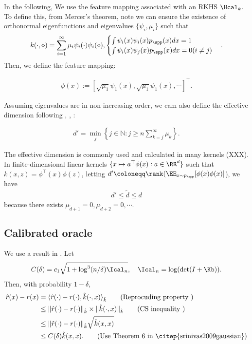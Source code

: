 In the following, We use the feature mapping associated with an RKHS $\Hcal_k$. To define this, from Mercer's theorem, note we can ensure the existence of orthonormal eigenfunctions and eigenvalues $\{\psi_i,\mu_i\}$ such that 
\begin{align*}
    k(\cdot,\diamond)=\sum_{i=1}^{\infty} \mu_i \psi_i(\cdot ) \psi_i(\diamond), \begin{cases} \int\psi_i(x)\psi_i(x)p_{\spp}(x)dx =1 \\ \int\psi_i(x)\psi_j(x)p_{\spp}(x)dx =0 (i\neq j)   \end{cases}. 
\end{align*}
Then, we define the feature mapping: 
\begin{definition}
    \begin{align*}
        \phi(x):=[\sqrt{\mu_1}\psi_1(x), \sqrt{\mu_1}\psi_1(x),\cdots]^{\top}. 
    \end{align*}
\end{definition}
Assuming eigenvalues are in non-increasing order, we cam also define the effective dimension following \citet[Appendix B]{srinivas2009gaussian}, \citet[Chapter 6.2]{uehara2021pessimistic}, \citet[Chapter C.3]{chang2021mitigating}:  
\begin{definition}
\begin{align*}
    d' = \min_{j} \left \{j \in \mathbb{N}: j \geq  n\sum_{k=j}^{\infty}\mu_k\right \}. 
\end{align*}
\end{definition}
The effective dimension is commonly used and calculated in many kernels (XXX). In finite-dimensional linear kernels $\{x\mapsto a^{\top}\phi(x):a\in \RR^d \}$ such that $k(x,z) =\phi^{\top}(x)\phi(z)$, letting 
$d'\coloneqq \rank(\EE_{x \sim p_{\spp} }[\phi(x)\phi(x)]$), we have 
\begin{align*}
     d' \leq \tilde d \leq d 
\end{align*}
because there exists $\mu_{\tilde d+1}=0,\mu_{\tilde d+2} =0,\cdots$. 


\subsection{Calibrated oracle}

We use a result in \citep{srinivas2009gaussian}. 
Let 
\begin{align*}
    C(\delta) = c_1 \sqrt{1+ \log^3(n/\delta) \Ical_{n}},\quad \Ical_n = \log(\det(I+\Kb)). 
\end{align*}
Then, with probability $1-\delta$, 
\begin{align*}
    \hat r(x)-r(x) & = \langle \hat r(\cdot)-r(\cdot), \hat k(\cdot,x)\rangle_{\hat k}  \tag{Reprocuding property } \\ 
    & \leq   \|\hat r(\cdot)-r(\cdot)\|_{\hat k} \times \|\hat k(\cdot,x)\|_{\hat k}  \tag{CS inequality } \\
    &\leq \|\hat r(\cdot)-r(\cdot)\|_{\hat k}\sqrt{\hat k(x,x)} \\
    & \leq C(\delta) \hat k(x,x). \tag{Use Theorem 6 in \citep{srinivas2009gaussian}} 
\end{align*}

